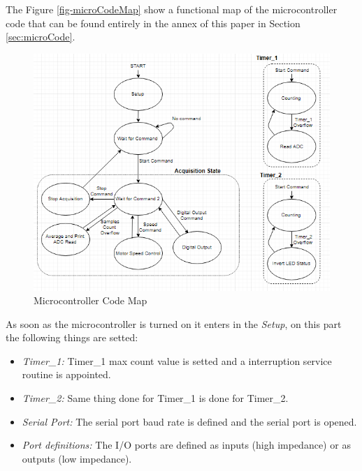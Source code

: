 	The Figure \ref{fig-microCodeMap} show a functional map of the microcontroller code that can be found entirely in the annex of this paper in Section \ref{sec:microCode}.
	
	\begin{figure}[htbp]
		\centering
		\includegraphics[scale=1]{figuras/fig-microCodeMap}
		\caption{Microcontroller Code Map \cite{microCodeMap}}
		\label{fig-microCode}
	\end{figure}
	
	
	As soon as the microcontroller is turned on it enters in the \textit{Setup}, on this part the following things are setted:
	\begin{itemize}
		\item \textit{Timer\_1: } Timer\_1 max count value is setted and a interruption service routine is appointed.
		\item \textit{Timer\_2: } Same thing done for Timer\_1 is done for Timer\_2.
		\item \textit{Serial Port: } The serial port baud rate is defined and the serial port is opened.
		\item \textit{Port definitions: } The I/O ports are defined as inputs (high impedance) or as outputs (low impedance).
	\end{itemize}
	
